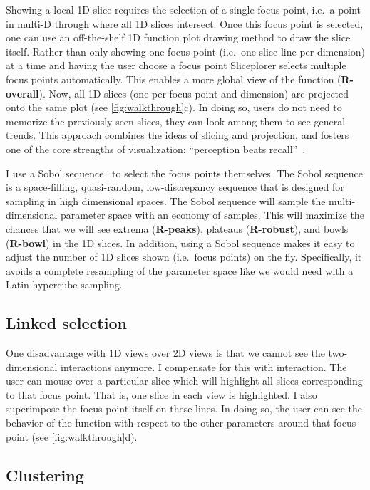 Showing a local 1D slice requires the selection of a single focus point, i.e.\
a point in multi-D through where all 1D slices intersect. Once this focus
point is selected, one can use an off-the-shelf 1D function plot drawing
method to draw the slice itself.
Rather than only
showing one focus point (i.e.\ one slice line per dimension) at a time and
having the user choose a focus point Sliceplorer selects multiple focus points
automatically. This enables a more global view of the function
(\textbf{R-overall}). Now, all 1D slices (one per focus point and dimension)
are projected onto the same plot (see \autoref{fig:walkthrough}c).  In doing
so, users do not need to memorize the previously seen slices, they can look
among them to see general trends. This approach combines the ideas of slicing
and projection, and fosters one of the core strengths of visualization:
``perception beats recall''~\cite{Munzner:2014}. 

I use a Sobol sequence~\cite{Sobol:1967} to select the focus points
themselves.  The Sobol sequence is a space-filling, quasi-random,
low-discrepancy sequence that is designed for sampling in high dimensional
spaces.  The Sobol sequence will sample the multi-dimensional
parameter space with an economy of samples. This will maximize the chances that
we will see extrema (\textbf{R-peaks}), plateaus (\textbf{R-robust}), and bowls
(\textbf{R-bowl}) in the 1D slices.  In addition, using a Sobol sequence makes
it easy to adjust the number of 1D slices shown (i.e.\ focus points) on the
fly.  Specifically, it avoids a complete resampling of the parameter space like
we would need with a Latin hypercube sampling. 


\subsection{Linked selection}

One disadvantage with 1D views over 2D views is that we cannot see the
two-dimensional interactions anymore. I compensate for this with
interaction. 
The user can mouse over a particular slice which will highlight
all slices corresponding to that focus point. That is, one slice in each view is highlighted.
I also superimpose the focus point itself on these lines. In doing so,
the user can see the behavior of the function with respect to the other
parameters around that focus point (see \autoref{fig:walkthrough}d).

\subsection{Clustering}

